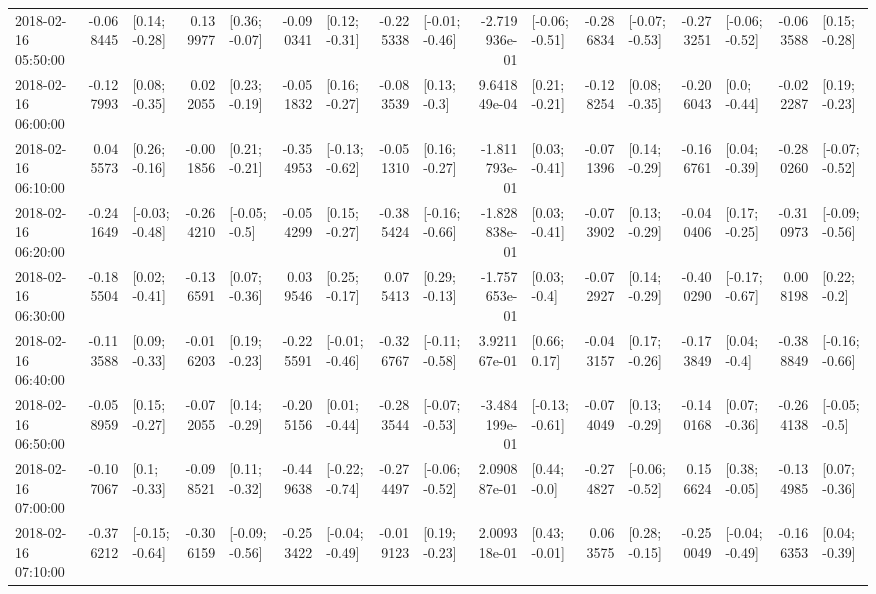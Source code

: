 \begin{tabular}{lrlrlrlrlrlrlrlrl}
2018-02-16 05:50:00 & -0.068445 &   [0.14; -0.28] &  0.139977 &   [0.36; -0.07] & -0.090341 &   [0.12; -0.31] & -0.225338 &  [-0.01; -0.46] & -2.719936e-01 &  [-0.06; -0.51] & -0.286834 &  [-0.07; -0.53] & -0.273251 &  [-0.06; -0.52] & -0.063588 &   [0.15; -0.28] \\
2018-02-16 06:00:00 & -0.127993 &   [0.08; -0.35] &  0.022055 &   [0.23; -0.19] & -0.051832 &   [0.16; -0.27] & -0.083539 &    [0.13; -0.3] &  9.641849e-04 &   [0.21; -0.21] & -0.128254 &   [0.08; -0.35] & -0.206043 &    [0.0; -0.44] & -0.022287 &   [0.19; -0.23] \\
2018-02-16 06:10:00 &  0.045573 &   [0.26; -0.16] & -0.001856 &   [0.21; -0.21] & -0.354953 &  [-0.13; -0.62] & -0.051310 &   [0.16; -0.27] & -1.811793e-01 &   [0.03; -0.41] & -0.071396 &   [0.14; -0.29] & -0.166761 &   [0.04; -0.39] & -0.280260 &  [-0.07; -0.52] \\
2018-02-16 06:20:00 & -0.241649 &  [-0.03; -0.48] & -0.264210 &   [-0.05; -0.5] & -0.054299 &   [0.15; -0.27] & -0.385424 &  [-0.16; -0.66] & -1.828838e-01 &   [0.03; -0.41] & -0.073902 &   [0.13; -0.29] & -0.040406 &   [0.17; -0.25] & -0.310973 &  [-0.09; -0.56] \\
2018-02-16 06:30:00 & -0.185504 &   [0.02; -0.41] & -0.136591 &   [0.07; -0.36] &  0.039546 &   [0.25; -0.17] &  0.075413 &   [0.29; -0.13] & -1.757653e-01 &    [0.03; -0.4] & -0.072927 &   [0.14; -0.29] & -0.400290 &  [-0.17; -0.67] &  0.008198 &    [0.22; -0.2] \\
2018-02-16 06:40:00 & -0.113588 &   [0.09; -0.33] & -0.016203 &   [0.19; -0.23] & -0.225591 &  [-0.01; -0.46] & -0.326767 &  [-0.11; -0.58] &  3.921167e-01 &    [0.66; 0.17] & -0.043157 &   [0.17; -0.26] & -0.173849 &    [0.04; -0.4] & -0.388849 &  [-0.16; -0.66] \\
2018-02-16 06:50:00 & -0.058959 &   [0.15; -0.27] & -0.072055 &   [0.14; -0.29] & -0.205156 &   [0.01; -0.44] & -0.283544 &  [-0.07; -0.53] & -3.484199e-01 &  [-0.13; -0.61] & -0.074049 &   [0.13; -0.29] & -0.140168 &   [0.07; -0.36] & -0.264138 &   [-0.05; -0.5] \\
2018-02-16 07:00:00 & -0.107067 &    [0.1; -0.33] & -0.098521 &   [0.11; -0.32] & -0.449638 &  [-0.22; -0.74] & -0.274497 &  [-0.06; -0.52] &  2.090887e-01 &    [0.44; -0.0] & -0.274827 &  [-0.06; -0.52] &  0.156624 &   [0.38; -0.05] & -0.134985 &   [0.07; -0.36] \\
2018-02-16 07:10:00 & -0.376212 &  [-0.15; -0.64] & -0.306159 &  [-0.09; -0.56] & -0.253422 &  [-0.04; -0.49] & -0.019123 &   [0.19; -0.23] &  2.009318e-01 &   [0.43; -0.01] &  0.063575 &   [0.28; -0.15] & -0.250049 &  [-0.04; -0.49] & -0.166353 &   [0.04; -0.39] \\

\end{tabular}
